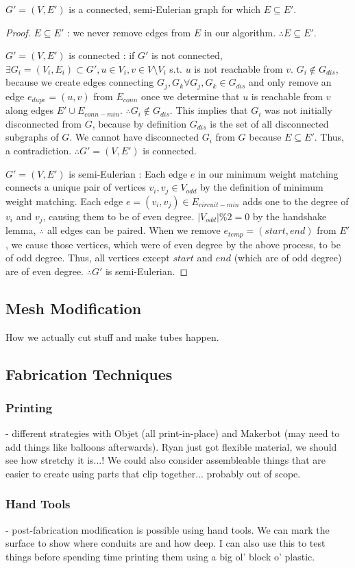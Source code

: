\begin{theorem}
 $G' = (V, E')$ is a connected, semi-Eulerian graph for which $E \subseteq E'$.
\end{theorem}
\begin{proof}
$E \subseteq E'$ : we never remove edges from $E$ in our algorithm.  $\therefore E \subseteq E'$.

$G' = (V, E')$ is connected : if $G'$ is not connected, $\exists G_i = (V_i, E_i) \subset G', u \in V_i, v\in V \setminus V_i$ s.t. $u$ is not reachable from $v$.  $G_i \not\in G_{dis}$, because we create edges connecting $G_j, G_k \forall G_j, G_k \in G_{dis}$ and only remove an edge $e_{dupe} = (u, v)$ from $E_{conn}$ once we determine that $u$ is reachable from $v$ along edges $E' \cup E_{conn-min}$.  $\therefore G_i \not\in G_{dis}$.  This implies that $G_i$ was not initially disconnected from $G$, because by definition $G_{dis}$ is the set of all disconnected subgraphs of $G$.  We cannot have disconnected $G_i$ from $G$ because $E \subseteq E'$.  Thus, a contradiction.  $\therefore G' = (V, E')$ is connected.

$G' = (V, E')$ is semi-Eulerian : Each edge $e$ in our minimum weight matching connects a unique pair of vertices $v_i, v_j \in V_{odd}$ by the definition of minimum weight matching.  Each edge $e = (v_i, v_j) \in E_{circuit-min}$ adds one to the degree of $v_i$ and $v_j$, causing them to be of even degree. $|V_{odd}| \% 2 = 0$ by the handshake lemma, $\therefore$ all edges can be paired.  When we remove $e_{temp} = (start, end)$ from $E'$, we cause those vertices, which were of even degree by the above process, to be of odd degree.  Thus, all vertices except $start$ and $end$ (which are of odd degree) are of even degree.  $\therefore G'$ is semi-Eulerian.
\end{proof}

\subsection{Mesh Modification}

How we actually cut stuff and make tubes happen.

\subsection{Fabrication Techniques}

\subsubsection{Printing} - different strategies with Objet (all print-in-place) and Makerbot (may need to add things like balloons afterwards).  Ryan just got flexible material, we should see how stretchy it is...!  We could also consider assembleable things that are easier to create using parts that clip together... probably out of scope.

\subsubsection{Hand Tools} - post-fabrication modification is possible using hand tools.  We can mark the surface to show where conduits are and how deep.  I can also use this to test things before spending time printing them using a big ol' block o' plastic.